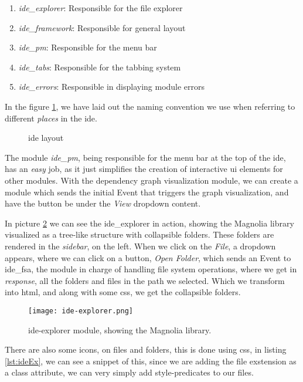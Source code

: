 \begin{enumerate}
  \item \textit{ide\_explorer}: Responsible for the file explorer
  \item \textit{ide\_framework}: Responsible for general layout
  \item \textit{ide\_pm}: Responsible for the menu bar
  \item \textit{ide\_tabs}: Responsible for the tabbing system
  \item \textit{ide\_errors}: Responsible in displaying module errors
\end{enumerate}

In the figure \ref{fig:ideLayout}, we have laid out the naming convention we
use when referring to different \textit{places} in the \gls{ide}.

\begin{figure}
  \centering
  
  \caption{\gls{ide} layout}
  \label{fig:ideLayout}
\end{figure}

The module \textit{ide\_pm}, being responsible for the menu bar at the top of
the \gls{ide}, has an \textit{easy} job, as it just simplifies the creation of
interactive \gls{ui} elements for other modules. With the dependency graph
visualization module, we can create a module which sends the initial Event that
triggers the graph visualization, and have the button be under the \textit{View}
dropdown content.

In picture \ref{pic:ideEx} we can see the ide\_explorer in action, showing the
Magnolia library visualized as a tree-like structure with collapsible folders.
These folders are rendered in the \textit{sidebar}, on the left. When we click
on the \textit{File}, a dropdown appears, where we can click on a button,
\textit{Open Folder}, which sends an Event to \gls{ide}\_fsa, the module in
charge of handling file system operations, where we get in \textit{response},
all the folders and files in the path we selected. Which we transform into
\gls{html}, and along with some \gls{css}, we get the collapsible folders.

\begin{figure}
  \centering
  \texttt{[image: ide-explorer.png]}
  \caption{
    \gls{ide}-explorer module, showing the Magnolia library.
  }
  \label{pic:ideEx}
\end{figure}

There are also some icons, on files and folders, this is done using \gls{css},
in listing \ref{lst:ideEx}, we can see a snippet of this, since we are adding
the file exstension as a class attribute, we can very simply add
style-predicates to our files.

